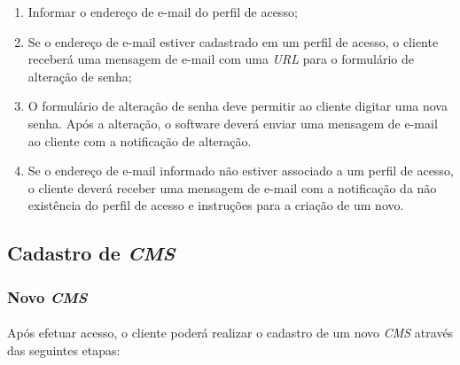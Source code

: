 \documentclass[a4paper,12pt]{article}
\def\cms{\emph{CMS}}
\def\url{\emph{URL}}
\begin{document}
\begin{enumerate}
\item Informar o endereço de e-mail do perfil de acesso;
\item Se o endereço de e-mail estiver cadastrado em um perfil de acesso, o
cliente receberá uma mensagem de e-mail com uma \url{} para o formulário de
alteração de senha;
\item O formulário de alteração de senha deve permitir ao cliente digitar uma
nova senha. Após a alteração, o software deverá enviar uma mensagem de e-mail
ao cliente com a notificação de alteração.
\item Se o endereço de e-mail informado não estiver associado a um perfil de
acesso, o cliente deverá receber uma mensagem de e-mail com a notificação da
não existência do perfil de acesso e instruções para a criação de um novo.
\end{enumerate}

\subsection{Cadastro de \cms{}}

\subsubsection{Novo \cms{}}

\paragraph{}
Após efetuar acesso, o cliente poderá realizar o cadastro de um novo \cms{}
através das seguintes etapas:
\end{document}
